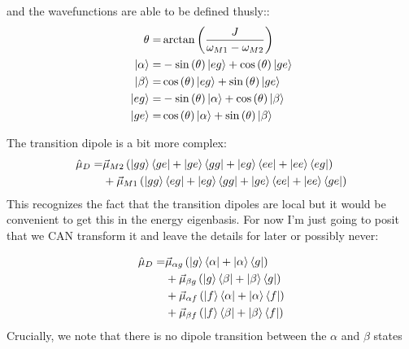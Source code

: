 and the wavefunctions are able to be defined thusly::
\begin{align}
	\theta =& \arctan\left( \frac{J}{\omega_{M1} - \omega_{M2}} \right) \\
	\ket{\alpha} =&-\sin \left(\theta \right) \ket{eg} +  \cos \left(\theta \right) \ket{ge} \\
	\ket{\beta} =&\cos \left(\theta \right) \ket{eg} +  \sin \left(\theta \right) \ket{ge} \\
	\ket{eg} =&-\sin \left(\theta \right) \ket{\alpha} +  \cos \left(\theta \right) \ket{\beta} \\
	\ket{ge} =&\cos \left(\theta \right) \ket{\alpha} +  \sin \left(\theta \right) \ket{\beta}
\end{align}

The transition dipole is a bit more complex:
\begin{align*}
	\hat{\mu}_{D} =& \vec{\mu}_{M2} \left( \ket{gg}\bra{ge} +  \ket{ge}\bra{gg} + \ket{eg}\bra{ee} + \ket{ee}\bra{eg}  \right) \\
	&+\vec{\mu}_{M1} \left( \ket{gg}\bra{eg} +  \ket{eg}\bra{gg} + \ket{ge}\bra{ee} + \ket{ee}\bra{ge}  \right)
\end{align*}
This recognizes the fact that the transition dipoles are local but it would be convenient to get this in the energy eigenbasis. For now I'm just going to posit that we CAN transform it and leave the details for later or possibly never:

\begin{align*}
	\hat{\mu}_{D} =& \vec{\mu}_{\alpha g} \left( \ket{g}\bra{\alpha} +  \ket{\alpha}\bra{g}  \right) \\
	&+\vec{\mu}_{\beta g} \left( \ket{g}\bra{\beta} +  \ket{\beta}\bra{g}  \right)\\
	&+\vec{\mu}_{\alpha f} \left( \ket{f}\bra{\alpha} +  \ket{\alpha}\bra{f}  \right)\\
	&+\vec{\mu}_{\beta f} \left( \ket{f}\bra{\beta} +  \ket{\beta}\bra{f}  \right)
\end{align*}
Crucially, we note that there is no dipole transition between the $\alpha$ and $\beta$ states


